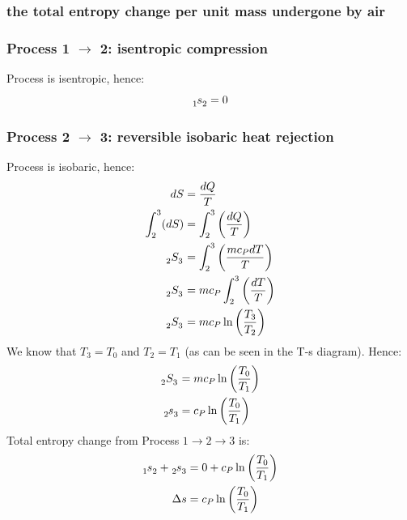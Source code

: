 \documentclass[12pt]{article}
\numberwithin{equation}{section}
\begin{document}
\begin{flushleft}
\subsubsection[Entropy change.]{the total entropy change per unit mass undergone by air}
\subsubsection*{Process 1 $\rightarrow$ 2: isentropic compression}
Process is isentropic, hence:
\begin{equation}
  \tensor[_1]{s}{_2} = 0
\end{equation}
\subsubsection*{Process 2 $\rightarrow$ 3: reversible isobaric heat rejection}
Process is isobaric, hence:
\begin{align}
  dS &= \frac{dQ}{T}\\
  \int_2^3 (dS) &= \int_2^3 \left(\frac{dQ}{T} \right)\\
  \tensor[_2]{S}{_3} &= \int_2^3 \left(\frac{mc_PdT}{T}\right)\\
  \tensor[_2]{S}{_3} &= mc_P\int_2^3 \left(\frac{dT}{T}\right)\\
  \tensor[_2]{S}{_3} &= mc_P \ln \left( \frac{T_3}{T_2} \right)
\end{align}
We know that $T_3 = T_0$ and $T_2 = T_1$ (as can be seen in the T-s diagram). Hence:
\begin{align}
  \tensor[_2]{S}{_3} &= mc_P \ln \left( \frac{T_0}{T_1} \right)\\
  \tensor[_2]{s}{_3} &= c_P \ln \left( \frac{T_0}{T_1} \right)
\end{align}
Total entropy change from Process $1 \rightarrow 2 \rightarrow 3$ is:
\begin{align}
  \tensor[_1]{s}{_2} + \tensor[_2]{s}{_3} &= 0 + c_P \ln \left( \frac{T_0}{T_1} \right)\\
  \Delta s &= c_P \ln \left( \frac{T_0}{T_1} \right)
\end{align}


\end{flushleft}
\end{document}
